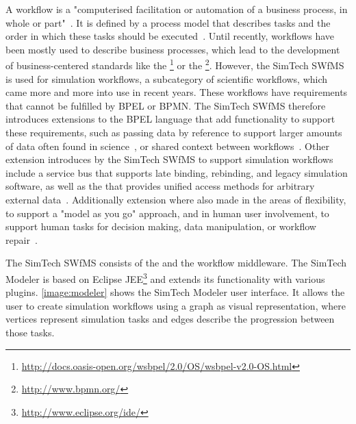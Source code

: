 A workflow is a "computerised facilitation or automation of a business process, in whole or part"~\autocite{workflow:referencemodel}.
It is defined by a process model that describes tasks and the order in which these tasks should be executed~\autocite{workflow:referencemodel}.
Until recently, workflows have been mostly used to describe business processes, which lead to the development of business-centered standards like the \footnote{\url{http://docs.oasis-open.org/wsbpel/2.0/OS/wsbpel-v2.0-OS.html}} or the \footnote{\url{http://www.bpmn.org/}}.
However, the SimTech SWfMS is used for simulation workflows, a subcategory of scientific workflows, which came more and more into use in recent years.
These workflows have requirements that cannot be fulfilled by BPEL or BPMN.
The SimTech SWfMS therefore introduces extensions to the BPEL language that add functionality to support these requirements, such as passing data by reference to support larger amounts of data often found in science~\autocite[also~see][]{workflow:simulation:modelling:datareferences}, or shared context between workflows~\autocite{workflow:simulation:modelling}.
Other extension introduces by the SimTech SWfMS to support simulation workflows include a service bus that supports late binding, rebinding, and legacy simulation software, as well as the  that provides unified access methods for arbitrary external data~\autocite{workflow:simulation:runtime}.
Additionally extension where also made in the areas of flexibility, to support a "model as you go" approach, and in human user involvement, to support human tasks for decision making, data manipulation, or workflow repair~\autocites{workflow:simulation:flexibility}{workflow:simulation:humanusers}.

The SimTech SWfMS consists of the  and the workflow middleware.
The SimTech Modeler is based on Eclipse JEE\footnote{\url{http://www.eclipse.org/ide/}} and extends its functionality with various plugins.
\autoref{image:modeler} shows the SimTech Modeler user interface.
It allows the user to create simulation workflows using a graph as visual representation, where vertices represent simulation tasks and edges describe the progression between those tasks.

